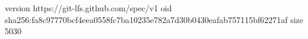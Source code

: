version https://git-lfs.github.com/spec/v1
oid sha256:fa8c97770bcf4eea0558fc7ba10235e782a7d30b0430eafab757115bf62271af
size 5030
